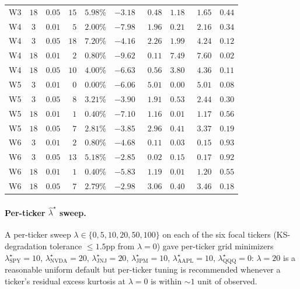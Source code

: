 \begin{table}[!ht]
\begin{tabular}{l c c r r r r r r r}
W3 & $18$ & $0.05$ & $15$           & $5.98\%$ & $-3.18$ & $\phantom{0}0.48$ & $1.18$ & $\phantom{0}1.65$ & $0.44$ \\
W4 & $3$  & $0.01$ & $\phantom{0}5$ & $2.00\%$ & $-7.98$ & $\phantom{0}1.96$ & $0.21$ & $\phantom{0}2.16$ & $0.34$ \\
W4 & $3$  & $0.05$ & $18$           & $7.20\%$ & $-4.16$ & $\phantom{0}2.26$ & $1.99$ & $\phantom{0}4.24$ & $0.12$ \\
W4 & $18$ & $0.01$ & $\phantom{0}2$ & $0.80\%$ & $-9.62$ & $\phantom{0}0.11$ & $7.49$ & $\phantom{0}7.60$ & $\mathbf{0.02}$ \\
W4 & $18$ & $0.05$ & $10$           & $4.00\%$ & $-6.63$ & $\phantom{0}0.56$ & $3.80$ & $\phantom{0}4.36$ & $0.11$ \\
W5 & $3$  & $0.01$ & $\phantom{0}0$ & $0.00\%$ & $-6.06$ & $\phantom{0}5.01$ & $0.00$ & $\phantom{0}5.01$ & $0.08$ \\
W5 & $3$  & $0.05$ & $\phantom{0}8$ & $3.21\%$ & $-3.90$ & $\phantom{0}1.91$ & $0.53$ & $\phantom{0}2.44$ & $0.30$ \\
W5 & $18$ & $0.01$ & $\phantom{0}1$ & $0.40\%$ & $-7.10$ & $\phantom{0}1.16$ & $0.01$ & $\phantom{0}1.17$ & $0.56$ \\
W5 & $18$ & $0.05$ & $\phantom{0}7$ & $2.81\%$ & $-3.85$ & $\phantom{0}2.96$ & $0.41$ & $\phantom{0}3.37$ & $0.19$ \\
W6 & $3$  & $0.01$ & $\phantom{0}2$ & $0.80\%$ & $-4.68$ & $\phantom{0}0.11$ & $0.03$ & $\phantom{0}0.15$ & $0.93$ \\
W6 & $3$  & $0.05$ & $13$           & $5.18\%$ & $-2.85$ & $\phantom{0}0.02$ & $0.15$ & $\phantom{0}0.17$ & $0.92$ \\
W6 & $18$ & $0.01$ & $\phantom{0}1$ & $0.40\%$ & $-5.83$ & $\phantom{0}1.19$ & $0.01$ & $\phantom{0}1.20$ & $0.55$ \\
W6 & $18$ & $0.05$ & $\phantom{0}7$ & $2.79\%$ & $-2.98$ & $\phantom{0}3.06$ & $0.40$ & $\phantom{0}3.46$ & $0.18$ \\
\bottomrule
\end{tabular}
\end{table}

\paragraph{Per-ticker $\hat\lambda^\star$ sweep.}
A per-ticker sweep $\lambda \in \{0, 5, 10, 20, 50, 100\}$ on each of the six focal tickers (KS-degradation tolerance $\le 1.5$pp from $\lambda = 0$) gave per-ticker grid minimizers $\lambda^\star_{\text{SPY}} = 10$, $\lambda^\star_{\text{NVDA}} = 20$, $\lambda^\star_{\text{JNJ}} = 20$, $\lambda^\star_{\text{JPM}} = 10$, $\lambda^\star_{\text{AAPL}} = 10$, $\lambda^\star_{\text{QQQ}} = 0$: $\lambda = 20$ is a reasonable uniform default but per-ticker tuning is recommended whenever a ticker's residual excess kurtosis at $\lambda = 0$ is within $\sim 1$ unit of observed.

